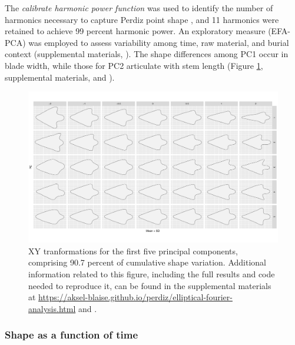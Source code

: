\documentclass[review]{elsarticle}
\begin{document}
The \textit{calibrate harmonic power function} was used to identify the number of harmonics necessary to capture Perdiz point shape \citep{RN8925}, and 11 harmonics were retained to achieve 99 percent harmonic power. An exploratory measure (EFA-PCA) was employed to assess variability among time, raw material, and burial context (supplemental materials, \citealt[Chapter 4]{RN8980}). The shape differences among PC1 occur in blade width, while those for PC2 articulate with stem length (Figure \ref{fig:pc.contrib}, supplemental materials, and \citealt[Chapter 4]{RN8980}).

\begin{figure}[h!]\centering
\includegraphics[width=\linewidth]{pc.contrib.pdf}
\caption{XY tranformations for the first five principal components, comprising 90.7 percent of cumulative shape variation. Additional information related to this figure, including the full results and code needed to reproduce it, can be found in the supplemental materials at \href{https://aksel-blaise.github.io/perdiz/elliptical-fourier-analysis.html}{https://aksel-blaise.github.io/perdiz/elliptical-fourier-analysis.html} and \citealp{RN8980}.}
\label{fig:pc.contrib}
\end{figure}

\subsubsection*{Shape as a function of time}
\end{document}
